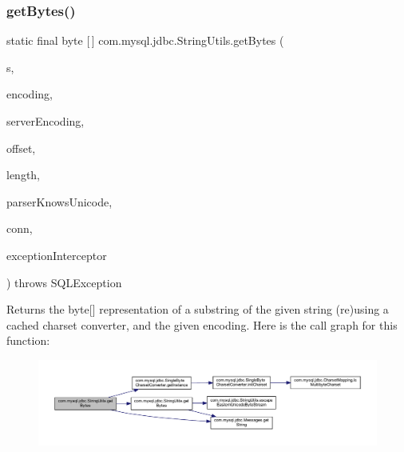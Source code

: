 \subsubsection{\texorpdfstring{get\+Bytes()}{getBytes()}\hspace{0.1cm}{\footnotesize\ttfamily [7/7]}}
{\footnotesize\ttfamily static final byte \mbox{[}$\,$\mbox{]} com.\+mysql.\+jdbc.\+String\+Utils.\+get\+Bytes (\begin{DoxyParamCaption}\item[{String}]{s,  }\item[{String}]{encoding,  }\item[{String}]{server\+Encoding,  }\item[{int}]{offset,  }\item[{int}]{length,  }\item[{boolean}]{parser\+Knows\+Unicode,  }\item[{\mbox{\hyperlink{interfacecom_1_1mysql_1_1jdbc_1_1_my_s_q_l_connection}{My\+S\+Q\+L\+Connection}}}]{conn,  }\item[{\mbox{\hyperlink{interfacecom_1_1mysql_1_1jdbc_1_1_exception_interceptor}{Exception\+Interceptor}}}]{exception\+Interceptor }\end{DoxyParamCaption}) throws S\+Q\+L\+Exception\hspace{0.3cm}{\ttfamily [static]}}

Returns the byte\mbox{[}\mbox{]} representation of a substring of the given string (re)using a cached charset converter, and the given encoding. Here is the call graph for this function\+:
\nopagebreak
\begin{figure}[H]
\begin{center}
\leavevmode
\includegraphics[width=350pt]{classcom_1_1mysql_1_1jdbc_1_1_string_utils_a0782bc62fd8f75d707d84487c9cd50cc_cgraph}
\end{center}
\end{figure}
\mbox{\label{classcom_1_1mysql_1_1jdbc_1_1_string_utils_afd812ec650baa8ee5d9218e48ec7e026}} 
